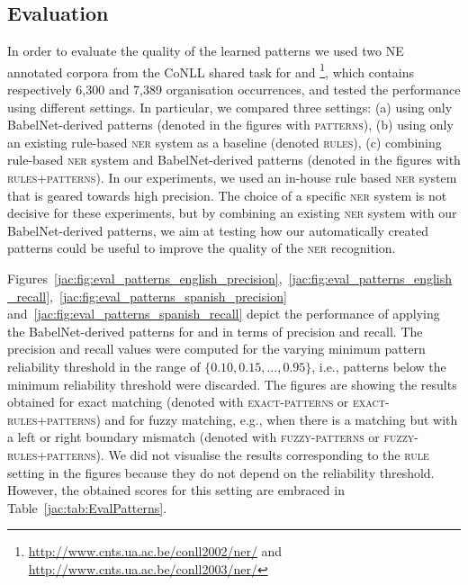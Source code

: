 \documentclass[output=paper]{langsci/langscibook}
\begin{document}
\subsection{Evaluation}
In order to evaluate the quality of the learned patterns we used two NE annotated corpora from the CoNLL shared task for  and \footnote{\url{http://www.cnts.ua.ac.be/conll2002/ner/} and \url{http://www.cnts.ua.ac.be/conll2003/ner/}}, which contains respectively 6,300 and 7,389 organisation occurrences, and tested the performance using different settings. In particular, we compared three settings: (a) using only BabelNet-derived patterns (denoted in the figures with \textsc{patterns}),  (b) using only an existing rule-based \textsc{ner} system as a baseline (denoted \textsc{rules}), (c) combining rule-based \textsc{ner} system and BabelNet-derived patterns (denoted in the figures with \textsc{rules+patterns}).
In our experiments, we used an in-house rule based \textsc{ner} system \citep{steinberger-11, ehrmann-15} that is geared towards high precision. The choice of a specific \textsc{ner} system is not decisive for these experiments, but by combining an existing \textsc{ner} system with our BabelNet-derived patterns, we aim at testing how our automatically created patterns could be useful to improve the quality of the \textsc{ner} recognition.

Figures~\ref{jac:fig:eval_patterns_english_precision},~\ref{jac:fig:eval_patterns_english_recall},~\ref{jac:fig:eval_patterns_spanish_precision}
and~\ref{jac:fig:eval_patterns_spanish_recall} depict the performance of applying the BabelNet-derived patterns for  and  
in terms of precision and recall. The precision and recall values were computed for the varying minimum pattern reliability threshold in the range of $\{0.10,0.15,...,0.95\}$, i.e., patterns below the minimum reliability threshold were discarded.
The figures are showing the results obtained for exact matching (denoted with \textsc{exact}-\textsc{patterns} or \textsc{exact}-\textsc{rules+patterns}) and for fuzzy matching, e.g., when there is a matching but with a left or right boundary mismatch (denoted with \textsc{fuzzy}-\textsc{patterns} or \textsc{fuzzy}-\textsc{rules+patterns}).
We did not visualise the results corresponding to the \textsc{rule} setting in the figures because they do not depend on the reliability threshold. However, the obtained scores for this setting are embraced in Table~\ref{jac:tab:EvalPatterns}.
\end{document}
